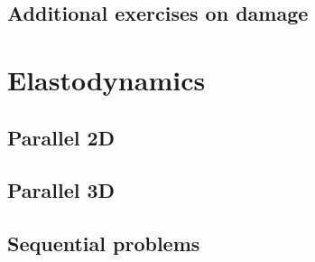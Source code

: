 \subsection{Additional exercises on damage}
{
	\renewcommand{\subsection}{\subsubsection}
	
}

\pagebreak

\section{Elastodynamics}

\subsection{Parallel 2D}

{
	\renewcommand{\subsection}{\subsubsection}
	
}

\subsection{Parallel 3D}

{
	\renewcommand{\subsection}{\subsubsection}
	
}


\subsection{Sequential problems}

{
	\renewcommand{\subsection}{\subsubsection}
	
}


